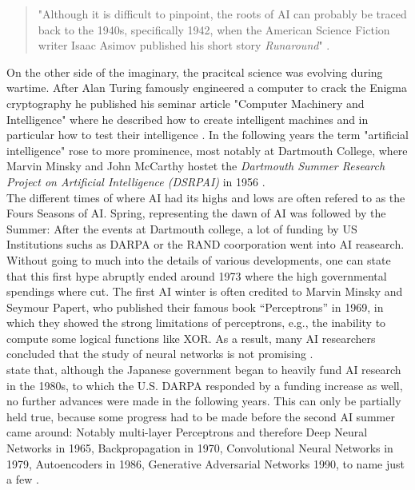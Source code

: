 \documentclass[
  a4paper,  %
  twoside,  %
  bibliography=totoc,
  headsepline,
  cleardoublepage=empty,
  parskip=half,
  draft=false
]{scrbook}
\begin{document}
\begin{quotation}
"Although it is difficult to pinpoint, the roots of AI can probably be traced back to the 1940s, specifically 1942, when the American Science Fiction writer Isaac Asimov published his short story \textit{Runaround}" \cite*{haenleinBriefHistoryArtificial2019}. 
\end{quotation}

On the other side of the imaginary, the pracitcal science was evolving during wartime. After Alan Turing famously engineered a computer to crack the Enigma cryptography he published his seminar article "Computer Machinery and Intelligence" where he described how to create intelligent machines and in particular how to test their intelligence \cite{haenleinBriefHistoryArtificial2019}. 
In the following years the term "artificial intelligence" rose to more prominence, most notably at Dartmouth College, where Marvin Minsky and John McCarthy hostet the \textit{Dartmouth Summer Research Project on Artificial Intelligence (DSRPAI)} in 1956 \cite{flasinskiHistoryArtificialIntelligence2016}. \\
The different times of where AI had its highs and lows are often refered to as the Fours Seasons of AI. Spring, representing the dawn of AI was followed by the Summer: After the events at Dartmouth college, a lot of funding by US Institutions suchs as DARPA or the RAND coorporation went into AI reasearch. Without going to much into the details of various developments, one can state that this first hype abruptly ended around 1973 where the high governmental spendings where cut. The first AI winter is often credited to Marvin Minsky and Seymour Papert, who published their famous book “Perceptrons” \cite{minskyPerceptronsIntroductionComputational2017} in 1969, in which they showed the strong limitations of perceptrons, e.g., the inability to compute some logical functions like XOR. As a result, many AI researchers concluded that the study of neural networks is not promising \cite{flasinskiHistoryArtificialIntelligence2016}. \\
 state that, although the Japanese government began to heavily fund AI research in the 1980s, to which the U.S. DARPA responded by a funding increase as well, no further advances were made in the following years. This can only be partially held true, because some progress had to be made before the second AI summer came around: Notably multi-layer Perceptrons and therefore Deep Neural Networks in 1965, Backpropagation in 1970, Convolutional Neural Networks in 1979, Autoencoders in 1986, Generative Adversarial Networks 1990, to name just a few \cite{schmidhuberAnnotatedHistoryModern2022}.
\end{document}
